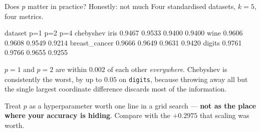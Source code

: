 \documentclass[aspectratio=169]{beamer}
\begin{document}
\begin{frame}[fragile,shrink=6]{Does $p$ matter in practice? Honestly: not
much}
Four standardised datasets, $k=5$, four metrics.
\begin{outblk}
dataset                p=1       p=2       p=4   chebyshev
iris                0.9467    0.9533    0.9400      0.9400
wine                0.9606    0.9608    0.9549      0.9214
breast_cancer       0.9666    0.9649    0.9631      0.9420
digits              0.9761    0.9766    0.9655      0.9255
\end{outblk}
\begin{center}\small
  $p=1$ and $p=2$ are within $0.002$ of each other \emph{everywhere}.
  Chebyshev is consistently the worst, by up to $0.05$ on \texttt{digits},
  because throwing away all but the single largest coordinate difference
  discards most of the information.
\end{center}
\begin{alertblock}{}
  \centering\footnotesize
  Treat $p$ as a hyperparameter worth one line in a grid search --- \textbf{not
  as the place where your accuracy is hiding}. Compare with the $+0.2975$ that
  scaling was worth.
\end{alertblock}
\end{frame}
\end{document}
